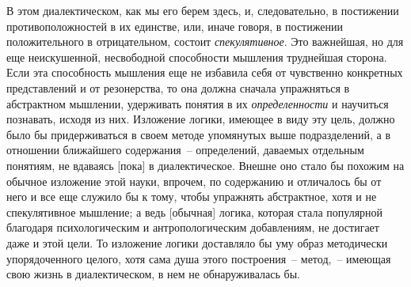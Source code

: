В этом диалектическом, как мы его берем здесь, и,
следовательно, в постижении противоположностей в их
единстве, или, иначе говоря, в постижении положительного
в отрицательном, состоит \emph{спекулятивное}. Это важнейшая,
но для еще неискушенной, несвободной способности
мышления труднейшая сторона. Если эта способность
мышления еще не избавила себя от чувственно
конкретных представлений и от резонерства, то она должна
сначала упражняться в абстрактном мышлении,
удерживать понятия в их \emph{определенности} и научиться
познавать, исходя из них. Изложение логики, имеющее
в виду эту цель, должно было бы придерживаться в своем
методе упомянутых выше подразделений, а в отношении
ближайшего содержания~-- определений, даваемых отдельным
понятиям, не вдаваясь [пока] в диалектическое.
Внешне оно стало бы похожим на обычное изложение
этой науки, впрочем, по содержанию и отличалось бы от
него и все еще служило бы к тому, чтобы упражнять
абстрактное, хотя и не спекулятивное мышление; а ведь
[обычная] логика, которая стала популярной благодаря
психологическим и антропологическим добавлениям, не
достигает даже и этой цели. То изложение логики доставляло
бы уму образ методически упорядоченного целого,
хотя сама душа этого построения~-- метод,~-- имеющая
свою жизнь в диалектическом, в нем не обнаруживалась
бы.

